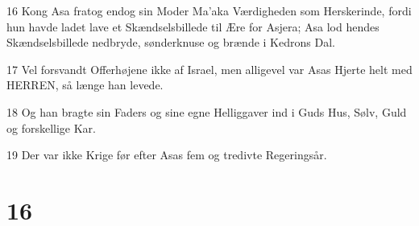 \par 16 Kong Asa fratog endog sin Moder Ma'aka Værdigheden som Herskerinde, fordi hun havde ladet lave et Skændselsbillede til Ære for Asjera; Asa lod hendes Skændselsbillede nedbryde, sønderknuse og brænde i Kedrons Dal.
\par 17 Vel forsvandt Offerhøjene ikke af Israel, men alligevel var Asas Hjerte helt med HERREN, så længe han levede.
\par 18 Og han bragte sin Faders og sine egne Helliggaver ind i Guds Hus, Sølv, Guld og forskellige Kar.
\par 19 Der var ikke Krige før efter Asas fem og tredivte Regeringsår.

\chapter{16}

